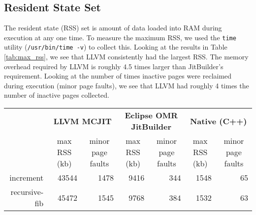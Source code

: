 \subsection{Resident State Set}
The resident state (RSS) set is amount of data loaded into RAM during execution at any one time.
To measure the maximum RSS, we used the \texttt{time} utility (\texttt{/usr/bin/time -v}) to collect this.
Looking at the results in Table \ref{tab:max_rss}, we see that LLVM consistently had the largest RSS.
The memory overhead required by LLVM is roughly 4.5 times larger than JitBuilder's requirement.
Looking at the number of times inactive pages were reclaimed during execution (minor page faults), we see that LLVM had roughly 4 times the number of inactive pages collected.

\begin{table*}[t]
  \begin{tabular}{|r|l|l|l|l|l|l|}
  \hline
  
  \multicolumn{1}{|l|}{\multirow{2}{*}{}} 
  & \multicolumn{2}{c|}{\textbf{LLVM MCJIT}}                                                                                    
  & \multicolumn{2}{c|}{\textbf{Eclipse OMR JitBuilder}}                                                                
  & \multicolumn{2}{c|}{\textbf{Native (C++)}}                                                                              
  \\ \cline{2-7}
  
  \multicolumn{1}{|c|}{\textbf{Program}}  
  & \multicolumn{1}{c|}{max RSS (kb)}  %
  & \multicolumn{1}{c|}{minor page faults}  
  & \multicolumn{1}{c|}{max RSS (kb)}  %
  & \multicolumn{1}{c|}{minor page faults}  
  & \multicolumn{1}{c|}{max RSS (kb)}  %
  & \multicolumn{1}{c|}{minor page faults}  
  \\ \hline

  increment                               
  & \multicolumn{1}{r|}{\num{43544}} %
  & \multicolumn{1}{r|}{\num{1478}} 
  & \multicolumn{1}{r|}{\num{9416}} %
  & \multicolumn{1}{r|}{\num{344}}
  & \multicolumn{1}{r|}{\num{1548}}    %
  & \multicolumn{1}{r|}{\num{65}}
  \\ \hline
  
  recursive-fib                           
  & \multicolumn{1}{r|}{\num{45472}} %
  & \multicolumn{1}{r|}{\num{1545}} 
  & \multicolumn{1}{r|}{\num{9768}} %
  & \multicolumn{1}{r|}{\num{384}} 
  & \multicolumn{1}{r|}{\num{1532}}   %
  & \multicolumn{1}{r|}{\num{63}} 
  \\ \hline
  

\end{tabular}
\end{table*}
